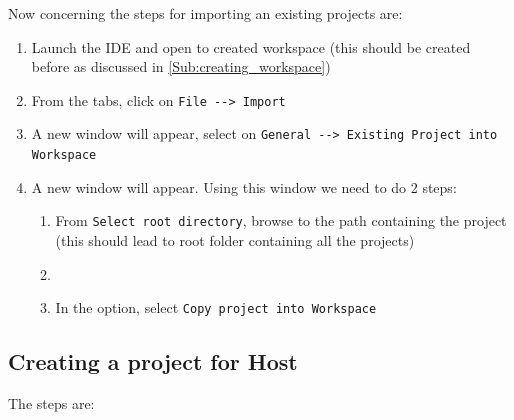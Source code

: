 Now concerning the steps for importing an existing projects are:

\begin{enumerate}
    \item Launch the IDE and open to created workspace (this should be created before as discussed in \ref{Sub:creating_workspace})
    
    \item From the tabs, click on \verb|File --> Import|
    
    \item A new window will appear, select on \verb|General --> Existing Project into Workspace|
    
    \item A new window will appear. Using this window we need to do 2 steps:
    
    \begin{enumerate}
        \item From \verb|Select root directory|, browse to the path containing the project (this should lead to root folder containing all the projects)
        
        \item \item In the option, select \verb|Copy project into Workspace|
        
    \end{enumerate}
    

\end{enumerate}



\subsection{Creating a project for Host}
\label{sub:creating_project_for_host}

The steps are:

